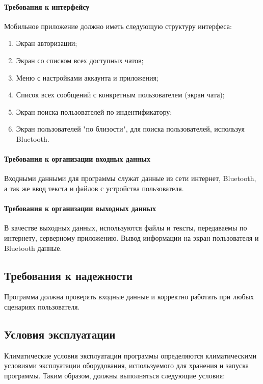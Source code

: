 \documentclass[techtask]{espd}
\begin{document}
\paragraph{Требования к интерфейсу}

Мобильное приложение должно иметь следующую структуру интерфеса:

\begin{enumerate}
\item Экран авторизации;
\item Экран со списком всех доступных чатов;
\item Меню с настройками аккаунта и приложения;
\item Список всех сообщений с конкретным пользователем (экран чата);
\item Экран поиска пользователей по индентификатору;
\item Экран пользователей "по близости", для поиска пользователей, используя Bluetooth.
\end{enumerate}

\paragraph{Требования к организации входных данных}
Входными данными для программы служат данные из сети интернет, Bluetooth, а так же ввод текста и файлов с устройства пользователя.

\paragraph{Требования к организации выходных данных}
В качестве выходных данных, используются файлы и тексты, передаваемы по интернету, серверному приложению. Вывод информации на экран пользователя и Bluetooth данные.

\subsection{Требования к надежности}
Программа должна проверять входные данные и корректно работать при любых сценариях пользователя.
\subsection{Условия эксплуатации}
Климатические условия эксплуатации программы определяются климатическими условиями эксплуатации оборудования, используемого для хранения и запуска программы. Таким образом, должны выполняться следующие условия:
\end{document}
